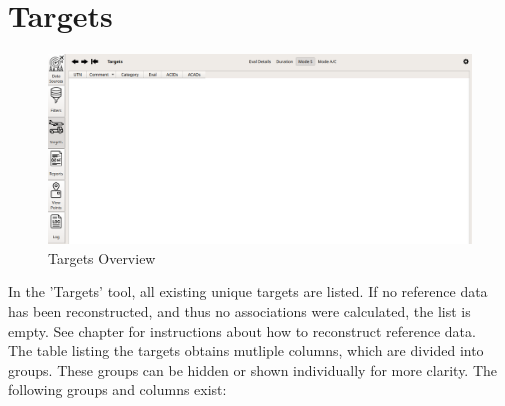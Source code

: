 
\section{Targets}
\label{sec:targets}

\begin{figure}[H]
    \hspace*{-2.5cm}
    \includegraphics[width=19cm,frame]{figures/ui_targets.png}
  \caption{Targets Overview}
\end{figure}

In the 'Targets' tool, all existing unique targets are listed. If no reference data has been reconstructed, and thus no associations were calculated, the list is empty. 
See chapter  for instructions about how to reconstruct reference data. \\

The table listing the targets obtains mutliple columns, which are divided into groups.
These groups can be hidden or shown individually for more clarity. The following groups and columns exist:

